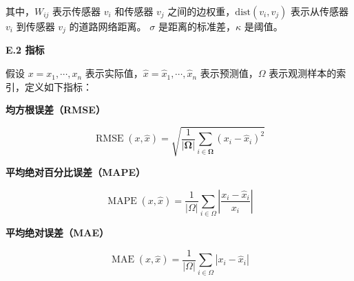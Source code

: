 \documentclass[10.5pt,compsoc,UTF8]{CjC}
\theoremstyle{mystyle}
\begin{document}
其中，\(W_{ij}\) 表示传感器 \(v_i\) 和传感器 \(v_j\) 之间的边权重，\(\text{dist}(v_i, v_j)\) 表示从传感器 \(v_i\) 到传感器 \(v_j\) 的道路网络距离。 \(\sigma\) 是距离的标准差，\(\kappa\) 是阈值。

\textbf{E.2 指标}

假设 \(x=x_{1}, \cdots, x_{n}\) 表示实际值，\(\hat{x}=\hat{x}_{1}, \cdots, \hat{x}_{n}\) 表示预测值，\(\Omega\) 表示观测样本的索引，定义如下指标：

\textbf{均方根误差（RMSE）}

\[
\operatorname{RMSE}(x, \hat{x})=\sqrt{\frac{1}{|\boldsymbol{\Omega}|} \sum_{i \in \boldsymbol{\Omega}}\left(x_{i}-\hat{x}_{i}\right)^{2}}
\]

\textbf{平均绝对百分比误差（MAPE）}

\[
\operatorname{MAPE}(x, \hat{x})=\frac{1}{|\Omega|} \sum_{i \in \Omega}\left|\frac{x_{i}-\hat{x}_{i}}{x_{i}}\right|
\]

\textbf{平均绝对误差（MAE）}

\[
\operatorname{MAE}(x, \hat{x})=\frac{1}{|\Omega|} \sum_{i \in \Omega}\left|x_{i}-\hat{x}_{i}\right|
\]
\end{document}
